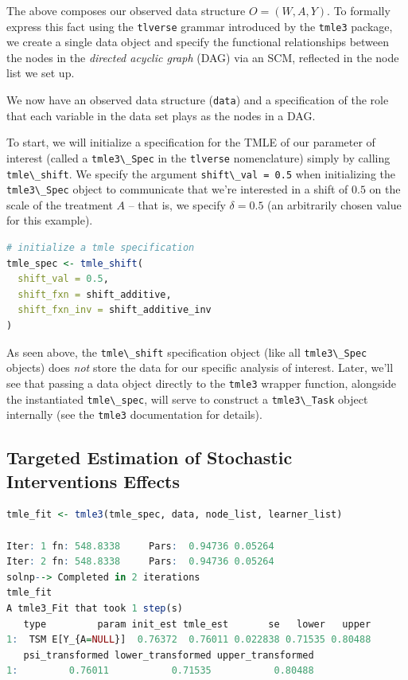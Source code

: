 \documentclass[
  12pt, krantz2,
]{krantz}
\newcommand{\passthrough}[1]{#1}
\newcommand{\1}{\mathbbm{1}}
\theoremstyle{definition}
\theoremstyle{definition}
\theoremstyle{definition}
\theoremstyle{definition}
\theoremstyle{remark}
\begin{document}
The above composes our observed data structure \(O = (W, A, Y)\). To formally
express this fact using the \passthrough{\lstinline!tlverse!} grammar introduced by the \passthrough{\lstinline!tmle3!} package,
we create a single data object and specify the functional relationships between
the nodes in the \emph{directed acyclic graph} (DAG) via an SCM, reflected in the
node list we set up.

We now have an observed data structure (\passthrough{\lstinline!data!}) and a specification of the role
that each variable in the data set plays as the nodes in a DAG.

To start, we will initialize a specification for the TMLE of our parameter of
interest (called a \passthrough{\lstinline!tmle3\_Spec!} in the \passthrough{\lstinline!tlverse!} nomenclature) simply by calling
\passthrough{\lstinline!tmle\_shift!}. We specify the argument \passthrough{\lstinline!shift\_val = 0.5!} when initializing the
\passthrough{\lstinline!tmle3\_Spec!} object to communicate that we're interested in a shift of \(0.5\) on
the scale of the treatment \(A\) -- that is, we specify \(\delta = 0.5\) (an
arbitrarily chosen value for this example).

\begin{lstlisting}[language=R]
# initialize a tmle specification
tmle_spec <- tmle_shift(
  shift_val = 0.5,
  shift_fxn = shift_additive,
  shift_fxn_inv = shift_additive_inv
)
\end{lstlisting}

As seen above, the \passthrough{\lstinline!tmle\_shift!} specification object (like all \passthrough{\lstinline!tmle3\_Spec!}
objects) does \emph{not} store the data for our specific analysis of interest. Later,
we'll see that passing a data object directly to the \passthrough{\lstinline!tmle3!} wrapper function,
alongside the instantiated \passthrough{\lstinline!tmle\_spec!}, will serve to construct a \passthrough{\lstinline!tmle3\_Task!}
object internally (see the \passthrough{\lstinline!tmle3!} documentation for details).

\hypertarget{targeted-estimation-of-stochastic-interventions-effects}{%
\subsection{Targeted Estimation of Stochastic Interventions Effects}\label{targeted-estimation-of-stochastic-interventions-effects}}

\begin{lstlisting}[language=R]
tmle_fit <- tmle3(tmle_spec, data, node_list, learner_list)

Iter: 1 fn: 548.8338     Pars:  0.94736 0.05264
Iter: 2 fn: 548.8338     Pars:  0.94736 0.05264
solnp--> Completed in 2 iterations
tmle_fit
A tmle3_Fit that took 1 step(s)
   type         param init_est tmle_est       se   lower   upper
1:  TSM E[Y_{A=NULL}]  0.76372  0.76011 0.022838 0.71535 0.80488
   psi_transformed lower_transformed upper_transformed
1:         0.76011           0.71535           0.80488
\end{lstlisting}
\end{document}
